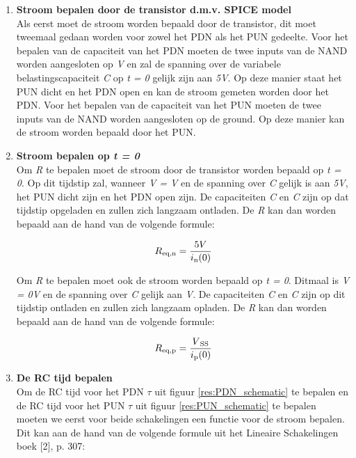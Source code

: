 \documentclass{article}
\begin{document}
\begin{enumerate}

\item \textbf{Stroom bepalen door de transistor d.m.v. SPICE model}\\
Als eerst moet de stroom worden bepaald door de transistor, dit moet tweemaal gedaan worden voor zowel het PDN als het PUN gedeelte. Voor het bepalen van de capaciteit van het PDN moeten de twee inputs van de NAND worden aangesloten op \emph{V} en zal de spanning over de variabele belastingscapaciteit \emph{C} op \emph{t = 0} gelijk zijn aan \emph{5V}. Op deze manier staat het PUN dicht en het PDN open en kan de stroom gemeten worden door het PDN. Voor het bepalen van de capaciteit van het PUN moeten de twee inputs van de NAND worden aangesloten op de ground. Op deze manier kan de stroom worden bepaald door het PUN.

\item \textbf{Stroom bepalen op \emph{t = 0}}\\
Om \emph{R} te bepalen moet de stroom door de transistor worden bepaald op \emph{t = 0}. Op dit tijdstip zal, wanneer \emph{V = V} en de spanning over \emph{C} gelijk is aan \emph{5V}, het PUN dicht zijn en het PDN open zijn.  De capaciteiten \emph{C} en \emph{C} zijn op dat tijdstip opgeladen en zullen zich langzaam ontladen. De \emph{R} kan dan worden bepaald aan de hand van de volgende formule:

\begin{equation}
R\textsubscript{eq,n} = \frac{5V}{i\textsubscript{n}(0)}
\end{equation}

Om \emph{R} te bepalen moet ook de stroom worden bepaald op \emph{t = 0}. Ditmaal is \emph{V = 0V} en de spanning over \emph{C} gelijk aan \emph{V}. De capaciteiten \emph{C} en \emph{C} zijn op dit tijdstip ontladen en zullen zich langzaam opladen. De \emph{R} kan dan worden bepaald aan de hand van de volgende formule:

\begin{equation}
R\textsubscript{eq,p} = \frac{V\textsubscript{SS}}{i\textsubscript{p}(0)}
\end{equation}

\item \textbf{De RC tijd bepalen}\\
Om de RC tijd voor het PDN $\tau$ uit figuur \ref{res:PDN_schematic} te bepalen en de RC tijd voor het PUN $\tau$ uit figuur \ref{res:PUN_schematic} te bepalen moeten we eerst voor beide schakelingen een functie voor de stroom bepalen. Dit kan aan de hand van de volgende formule uit het Lineaire Schakelingen boek [2], p. 307:


\end{enumerate}
\end{document}
